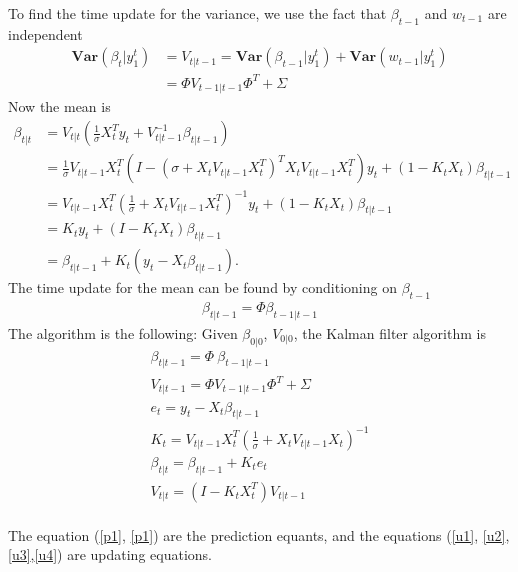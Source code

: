 \documentclass{article}
\numberwithin{algorithm}{section}
\theoremstyle{plain}
\theoremstyle{definition}
\theoremstyle{remark}
\newcommand{\Var}{\mathbf{Var}}
\begin{document}
To find the time update for the variance, we use the fact that $\beta_{t-1}$ and $w_{t-1}$ are independent
\begin{equation}
\begin{split}
\Var(\beta_t|y^t_1) &= V_{t|t-1} = \Var(\beta_{t-1}|y^t_1) + \Var(w_{t-1}|y^t_1)\\
&= \Phi V_{t-1|t-1}\Phi ^T + \Sigma
\end{split}
\end{equation}
Now the mean is
\begin{equation}
\begin{split}
\beta_{t|t} &= V_{t|t} ( \frac1\sigma X_t^T y_t + V_{t|t-1}^{-1} \beta_{t|t-1})\\
&= \frac1\sigma V_{t|t-1} X_t^T (I - (\sigma + X_t V_{t|t-1} X_t^T )^T X_t  V_{t|t-1} X_t^T) y_t+ (1-K_t X_t) \beta_{t|t-1}\\
&= V_{t|t-1} X_t^T ( \frac1\sigma + X_t V_{t|t-1} X_t^T)^{-1} y_t + (1-K_t X_t) \beta_{t|t-1}\\
&= K_t y_t + (I - K_t X_t) \beta_{t|t-1}\\
&= \beta_{t|t-1}+ K_t (y_t - X_t \beta_{t|t-1}).
\end{split}
\end{equation}
The time update for the mean can be found by conditioning on $\beta_{t-1}$
\begin{equation}
\begin{split}
\beta_{t|t-1} =\Phi  \beta_{t-1|t-1}
\end{split}
\end{equation}
The algorithm is the following:
Given $\beta_{0|0}$, $V_{0|0}$, the Kalman filter algorithm is
\begin{eqnarray}
\beta_{t|t-1} = \Phi \: \beta_{t-1|t-1}\label{p1}\\
V_{t|t-1} = \Phi  V_{t-1|t-1} \Phi ^T + \Sigma \label{p2}\\
e_t = y_t -  X_t \beta_{t|t-1} \label{u1}\\
K_t =  V_{t|t-1} X_t^T (\frac1\sigma + X_t V_{t|t-1} X_t )^{-1}\label{u4}\\
\beta_{t|t} = \beta_{t|t-1} + K_t e_t\label{u2}\\
V_{t|t} = (I - K_t X_t^T) V_{t|t-1}\label{u3}\\
\end{eqnarray}

The equation (\ref{p1}, \ref{p1}) are the prediction equants, and the equations (\ref{u1}, \ref{u2}, \ref{u3},\ref{u4}) are updating equations.
\end{document}

